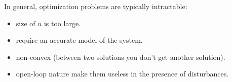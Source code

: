 In general, optimization problems are typically intractable:\\
\begin{minipage}[t]{0.4\textwidth}
 \begin{itemize}
    \item size of $u$ is too large.
    \item require an accurate model of the system.   
 \end{itemize}
\end{minipage}
\begin{minipage}[t]{0.6\textwidth}
 \begin{itemize}
    \item non-convex (between two solutions you don't get another solution).
    \item open-loop nature make them useless in the presence of disturbances. 
 \end{itemize}
\end{minipage}

